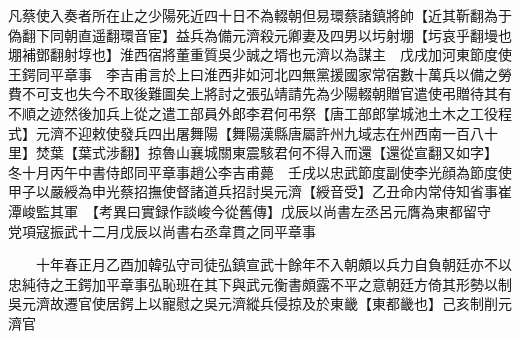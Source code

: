 凡蔡使入奏者所在止之少陽死近四十日不為輟朝但易環蔡諸鎮將帥【近其靳翻為于偽翻下同朝直遥翻環音宦】益兵為備元濟殺元卿妻及四男以圬射堋【圬哀乎翻墁也堋補鄧翻射埻也】淮西宿將董重質吳少誠之壻也元濟以為謀主　戊戌加河東節度使王鍔同平章事　李吉甫言於上曰淮西非如河北四無黨援國家常宿數十萬兵以備之勞費不可支也失今不取後難圖矣上將討之張弘靖請先為少陽輟朝贈官遣使弔贈待其有不順之迹然後加兵上從之遣工部員外郎李君何弔祭【唐工部郎掌城池土木之工役程式】元濟不迎敕使發兵四出屠舞陽【舞陽漢縣唐屬許州九域志在州西南一百八十里】焚葉【葉式涉翻】掠魯山襄城關東震駭君何不得入而還【還從宣翻又如字】　冬十月丙午中書侍郎同平章事趙公李吉甫薨　壬戌以忠武節度副使李光顔為節度使甲子以嚴綬為申光蔡招撫使督諸道兵招討吳元濟【綬音受】乙丑命内常侍知省事崔潭峻監其軍　【考異曰實録作談峻今從舊傳】戊辰以尚書左丞呂元膺為東都留守　党項寇振武十二月戊辰以尚書右丞韋貫之同平章事

　　十年春正月乙酉加韓弘守司徒弘鎮宣武十餘年不入朝頗以兵力自負朝廷亦不以忠純待之王鍔加平章事弘恥班在其下與武元衡書頗露不平之意朝廷方倚其形勢以制吳元濟故遷官使居鍔上以寵慰之吳元濟縱兵侵掠及於東畿【東都畿也】己亥制削元濟官

